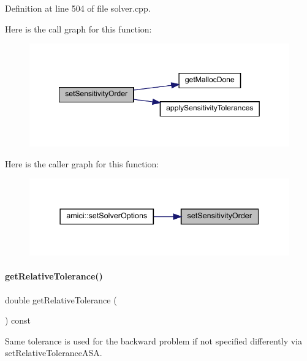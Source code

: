 Definition at line 504 of file solver.\+cpp.

Here is the call graph for this function\+:
\nopagebreak
\begin{figure}[H]
\begin{center}
\leavevmode
\includegraphics[width=349pt]{classamici_1_1_solver_a26129f061fdf7869be2d3e4aa22532b6_cgraph}
\end{center}
\end{figure}
Here is the caller graph for this function\+:
\nopagebreak
\begin{figure}[H]
\begin{center}
\leavevmode
\includegraphics[width=337pt]{classamici_1_1_solver_a26129f061fdf7869be2d3e4aa22532b6_icgraph}
\end{center}
\end{figure}
\mbox{\label{classamici_1_1_solver_a54fe1b062315ed19b2dbf88206415e06}} 
\paragraph{\texorpdfstring{getRelativeTolerance()}{getRelativeTolerance()}}
{\footnotesize\ttfamily double get\+Relative\+Tolerance (\begin{DoxyParamCaption}{ }\end{DoxyParamCaption}) const}

Same tolerance is used for the backward problem if not specified differently via set\+Relative\+Tolerance\+A\+SA.

